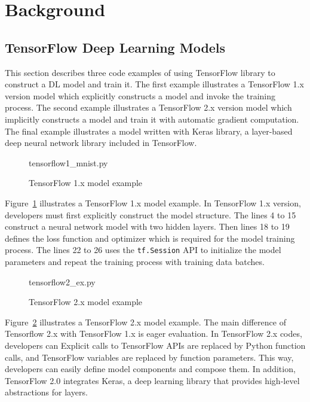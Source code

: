 \section{Background}\label{sec:background}
\subsection{TensorFlow Deep Learning Models}

This section describes three code examples of using TensorFlow library
to construct a DL model and train it.
The first example illustrates a TensorFlow 1.x version model
which explicitly constructs a model and invoke the training process.
The second example illustrates a TensorFlow 2.x version model
which implicitly constructs a model and train it with automatic
gradient computation.
The final example illustrates a model written with Keras library,
a layer-based deep neural network library included in TensorFlow.

\begin{figure}[ht!]

{tensorflow1_mnist.py}
  \caption{TensorFlow 1.x model example}
\label{fig:back:tf1}
\end{figure}

Figure~\ref{fig:back:tf1} illustrates a TensorFlow 1.x model example.
In TensorFlow 1.x version, developers must first explicitly construct the model
structure.
The lines 4 to 15 construct a neural network model with two hidden layers. 
Then lines 18 to 19 defines the loss function and optimizer which is required
for the model training process.
The lines 22 to 26 uses the {\tt tf.Session} API to initialize the
model parameters and repeat the training process with training data batches.
 
\begin{figure}[ht!]

{tensorflow2_ex.py}
  \caption{TensorFlow 2.x model example}
\label{fig:back:tf2}
\end{figure}

Figure~\ref{fig:back:tf2} illustrates a TensorFlow 2.x model example.
The main difference of Tensorflow 2.x with TensorFlow 1.x is eager evaluation.
In TensorFlow 2.x codes, developers can 
Explicit calls to TensorFlow APIs are replaced by Python function calls,
and TensorFlow variables are replaced by function parameters.
This way, developers can easily define model components and compose them. 
In addition, TensorFlow 2.0 integrates Keras\cite{keras},
a deep learning library that provides high-level abstractions for layers.

